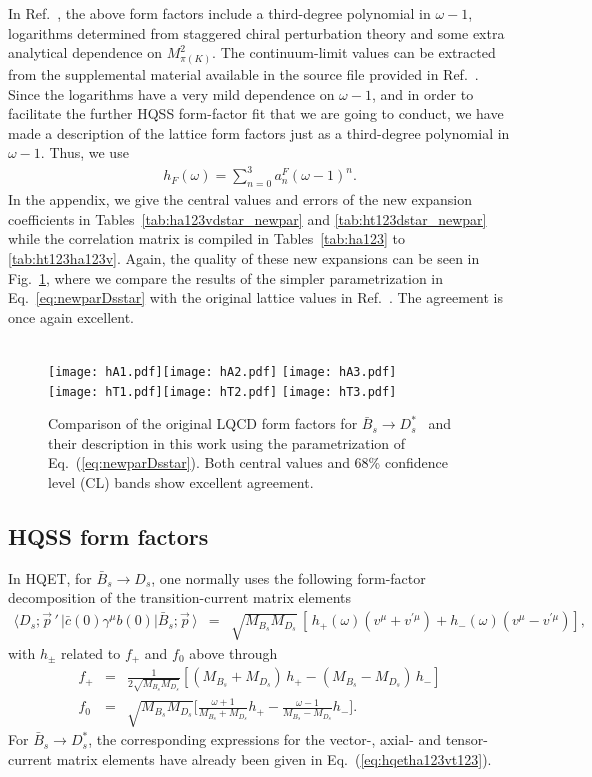 \documentclass[aps,superscriptaddress,showpacs,nofootinbib,11pt]{revtex4-1}
\newcommand{\bea}{\begin{eqnarray}} \newcommand{\eea}{\end{eqnarray}}
\newcommand{\mbs}{M_{B_s}}
\newcommand{\mds}{M_{D_s}}
\begin{document}
In Ref.~\cite{Harrison:2023dzh}, the above form factors include a third-degree polynomial in $\omega-1$, logarithms  determined from staggered chiral perturbation theory and some extra analytical dependence on $M_{\pi(K)}^2$. The continuum-limit values  can be extracted from the supplemental material available in the source file provided in Ref.~\cite{Harrison:2023dzh}. Since the logarithms have a very mild dependence on $\omega-1$, and in order to facilitate the further HQSS form-factor fit that we are going to conduct, we have made a description of the lattice form factors  just as a third-degree polynomial in $\omega-1$. Thus, we use
\bea
h_F(\omega) =\sum_{n=0}^3a_n^F(\omega-1)^n.
\label{eq:newparDsstar}
\eea
In the appendix, we give the central values and errors of the new expansion coefficients   in Tables~\ref{tab:ha123vdstar_newpar} and \ref{tab:ht123dstar_newpar}  while the correlation matrix is compiled in Tables~\ref{tab:ha123} to \ref{tab:ht123ha123v}. Again, the quality of these
new expansions can be seen in Fig.~\ref{fig:compDsstar}, where we compare the results of the simpler
 parametrization in Eq.~\ref{eq:newparDsstar} with the original lattice values in Ref.~\cite{McLean:2019qcx}. The agreement is once again
excellent.
\begin{figure}
\begin{center}
\\
\texttt{[image: hA1.pdf]}\texttt{[image: hA2.pdf]}
\texttt{[image: hA3.pdf]}\\
\texttt{[image: hT1.pdf]}\texttt{[image: hT2.pdf]}
\texttt{[image: hT3.pdf]}
\caption{ Comparison of the original LQCD form factors for  $\bar B_s\to D^*_s$~\cite{Harrison:2023dzh} 
and their description in this work using the parametrization of Eq.~(\ref{eq:newparDsstar}). 
Both central values and 68\% confidence level (CL) bands show excellent agreement.}\label{fig:compDsstar}
\end{center}
\end{figure}
\subsection{HQSS form factors}

In HQET, for $\bar B_s\to D_s$, one normally uses the following form-factor decomposition of the 
transition-current matrix elements~\cite{Bernlochner:2017jka}
%
\bea
\langle D_s;\vec p\,'\,|\bar c(0)\gamma^\mu b(0)|\bar B_s;\vec p\,\rangle&=&
\sqrt{\mbs\mds}\,[\,h_+(\omega)(v^\mu+v^{\prime\mu})+h_-(\omega)(v^\mu-v^{\prime\mu})],
\eea
with $h_{\pm}$ related to $f_+$ and $f_0$ above through
\bea
f_+&=&\frac1{2\sqrt{\mbs\mds}} [(\mbs+\mds)\,h_+-(\mbs-\mds)\,h_-]\nonumber\\
f_0&=&\sqrt{\mbs\mds}\Big[\frac{\omega+1}{\mbs+\mds}h_+-\frac{\omega-1}{\mbs-\mds}h_-\Big].
\eea
For $\bar B_s\to D^*_s$, the corresponding expressions for the vector-, axial- and tensor-current matrix elements have already been given in  Eq.~(\ref{eq:hqetha123vt123}).
\end{document}
